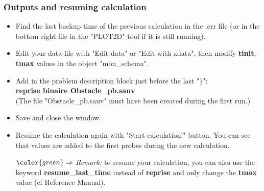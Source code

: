 \documentclass[10pt, hyperref={unicode=true,pdfusetitle, bookmarks=true,bookmarksnumbered=false,bookmarksopen=false, breaklinks=false,pdfborder={0 0 1},backref=true,colorlinks=true,linkcolor=darkblue,pageanchor}]{beamer}
\begin{document}
\begin{frame}
\frametitle{Outputs and resuming calculation}
\begin{block}{}

\begin{itemize}
\item Find the last backup time of the previous calculation in the .err file (or in the bottom right file in the "PLOT2D" tool if it is still running).

\item \label{save_restart} Edit your data file with "Edit data" or "Edit with xdata", then modify \textbf{tinit}, \textbf{tmax} values in the object "mon\_schema".

\item Add in the problem description block just before the last "\}":\\
\textbf{reprise binaire Obstacle\_pb.sauv}\\
(The file "Obstacle\_pb.sauv" must have been created during the first run.)

\item Save and close the window.

\item Resume the calculation again with "Start calculation!" button. You can see that values are added to the first probes during the new calculation.

\item [$\color{green}\Rightarrow$] \textit{Remark:} to resume your calculation, you can also use the keyword \textbf{resume\_last\_time} instead of \textbf{reprise} and only change the \textbf{tmax} value (cf Reference Manual).
\end{itemize}

\end{block}
\end{frame}
\end{document}

